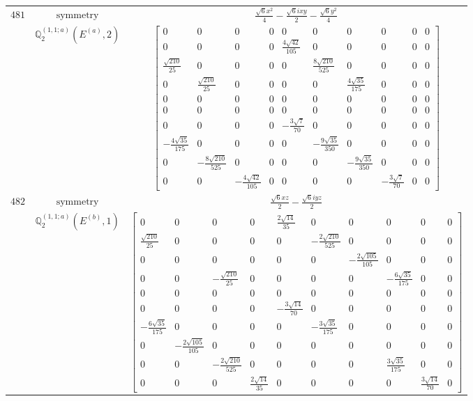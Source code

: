 \documentclass[fleqn,8pt,landscape]{jsarticle}
\begin{document}
\begin{longtable}{ccc}
$ 481 $ & $ \text{symmetry} $ & $ \frac{\sqrt{6} x^{2}}{4} - \frac{\sqrt{6} i x y}{2} - \frac{\sqrt{6} y^{2}}{4} $ \\
$  $ & $ \mathbb{Q}_{2}^{(1,1;a)}(E^{(a)},2) $ & $ \begin{bmatrix} 0 & 0 & 0 & 0 & 0 & 0 & 0 & 0 & 0 & 0 \\ 0 & 0 & 0 & 0 & \frac{4 \sqrt{42}}{105} & 0 & 0 & 0 & 0 & 0 \\ \frac{\sqrt{210}}{25} & 0 & 0 & 0 & 0 & \frac{8 \sqrt{210}}{525} & 0 & 0 & 0 & 0 \\ 0 & \frac{\sqrt{210}}{25} & 0 & 0 & 0 & 0 & \frac{4 \sqrt{35}}{175} & 0 & 0 & 0 \\ 0 & 0 & 0 & 0 & 0 & 0 & 0 & 0 & 0 & 0 \\ 0 & 0 & 0 & 0 & 0 & 0 & 0 & 0 & 0 & 0 \\ 0 & 0 & 0 & 0 & - \frac{3 \sqrt{7}}{70} & 0 & 0 & 0 & 0 & 0 \\ - \frac{4 \sqrt{35}}{175} & 0 & 0 & 0 & 0 & - \frac{9 \sqrt{35}}{350} & 0 & 0 & 0 & 0 \\ 0 & - \frac{8 \sqrt{210}}{525} & 0 & 0 & 0 & 0 & - \frac{9 \sqrt{35}}{350} & 0 & 0 & 0 \\ 0 & 0 & - \frac{4 \sqrt{42}}{105} & 0 & 0 & 0 & 0 & - \frac{3 \sqrt{7}}{70} & 0 & 0 \end{bmatrix} $ \\ \hline
$ 482 $ & $ \text{symmetry} $ & $ \frac{\sqrt{6} x z}{2} - \frac{\sqrt{6} i y z}{2} $ \\
$  $ & $ \mathbb{Q}_{2}^{(1,1;a)}(E^{(b)},1) $ & $ \begin{bmatrix} 0 & 0 & 0 & 0 & \frac{2 \sqrt{14}}{35} & 0 & 0 & 0 & 0 & 0 \\ \frac{\sqrt{210}}{25} & 0 & 0 & 0 & 0 & - \frac{2 \sqrt{210}}{525} & 0 & 0 & 0 & 0 \\ 0 & 0 & 0 & 0 & 0 & 0 & - \frac{2 \sqrt{105}}{105} & 0 & 0 & 0 \\ 0 & 0 & - \frac{\sqrt{210}}{25} & 0 & 0 & 0 & 0 & - \frac{6 \sqrt{35}}{175} & 0 & 0 \\ 0 & 0 & 0 & 0 & 0 & 0 & 0 & 0 & 0 & 0 \\ 0 & 0 & 0 & 0 & - \frac{3 \sqrt{14}}{70} & 0 & 0 & 0 & 0 & 0 \\ - \frac{6 \sqrt{35}}{175} & 0 & 0 & 0 & 0 & - \frac{3 \sqrt{35}}{175} & 0 & 0 & 0 & 0 \\ 0 & - \frac{2 \sqrt{105}}{105} & 0 & 0 & 0 & 0 & 0 & 0 & 0 & 0 \\ 0 & 0 & - \frac{2 \sqrt{210}}{525} & 0 & 0 & 0 & 0 & \frac{3 \sqrt{35}}{175} & 0 & 0 \\ 0 & 0 & 0 & \frac{2 \sqrt{14}}{35} & 0 & 0 & 0 & 0 & \frac{3 \sqrt{14}}{70} & 0 \end{bmatrix} $ \\ \hline

\end{longtable}
\end{document}

